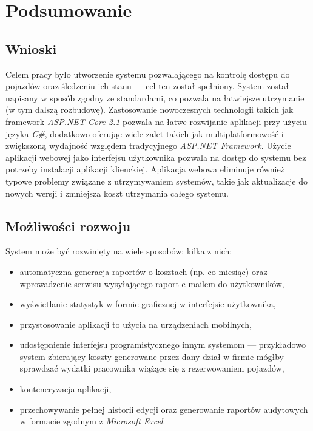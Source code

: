 \documentclass[eng,printmode,openany]{mgr}
\begin{document}
	\chapter{Podsumowanie}
	\section{Wnioski}
	Celem pracy było utworzenie systemu pozwalającego na kontrolę dostępu do pojazdów oraz śledzeniu ich stanu — cel ten został spełniony. System został napisany w sposób zgodny ze standardami, co pozwala na łatwiejsze utrzymanie (w tym dalszą rozbudowę). Zastosowanie nowoczesnych technologii takich jak framework \textit{ASP.NET Core 2.1} pozwala na łatwe rozwijanie aplikacji przy użyciu języka \textit{C\#}, dodatkowo oferując wiele zalet takich jak multiplatformowość i zwiększoną wydajność względem tradycyjnego \textit{ASP.NET Framework}. Użycie aplikacji webowej jako interfejsu użytkownika pozwala na dostęp do systemu bez potrzeby instalacji aplikacji klienckiej. Aplikacja webowa eliminuje również typowe problemy związane z utrzymywaniem systemów, takie jak aktualizacje do nowych wersji i zmniejsza koszt utrzymania całego systemu.
	
	\section{Możliwości rozwoju}
	System może być rozwinięty na wiele sposobów; kilka z nich:
	\begin{itemize}
		\item automatyczna generacja raportów o kosztach (np. co miesiąc) oraz wprowadzenie serwisu wysyłającego raport e-mailem do użytkowników,
		\item wyświetlanie statystyk w formie graficznej w interfejsie użytkownika,
		\item przystosowanie aplikacji to użycia na urządzeniach mobilnych,
		\item udostępnienie interfejsu programistycznego innym systemom — przykładowo system zbierający koszty generowane przez dany dział w firmie mógłby sprawdzać wydatki pracownika wiążące się z rezerwowaniem pojazdów,
		\item konteneryzacja aplikacji,
		\item przechowywanie pełnej historii edycji oraz generowanie raportów audytowych w formacie zgodnym z \textit{Microsoft Excel}.
	\end{itemize}
	
	
	
\end{document}
